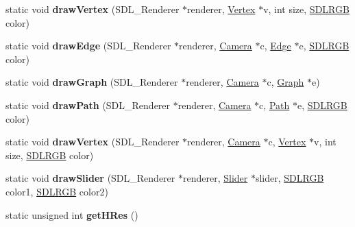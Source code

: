 \begin{DoxyCompactItemize}
\item 
\hypertarget{class_s_d_l_graph_draw_af9a230f883ac350775a38d0eee926556}{}static void {\bfseries draw\+Vertex} (S\+D\+L\+\_\+\+Renderer $\ast$renderer, \hyperlink{class_vertex}{Vertex} $\ast$v, int size, \hyperlink{class_s_d_l_r_g_b}{S\+D\+L\+R\+G\+B} color)\label{class_s_d_l_graph_draw_af9a230f883ac350775a38d0eee926556}

\item 
\hypertarget{class_s_d_l_graph_draw_aa9c19af048839c159e655a30c7a7c192}{}static void {\bfseries draw\+Edge} (S\+D\+L\+\_\+\+Renderer $\ast$renderer, \hyperlink{class_camera}{Camera} $\ast$c, \hyperlink{class_edge}{Edge} $\ast$e, \hyperlink{class_s_d_l_r_g_b}{S\+D\+L\+R\+G\+B} color)\label{class_s_d_l_graph_draw_aa9c19af048839c159e655a30c7a7c192}

\item 
\hypertarget{class_s_d_l_graph_draw_a4585253ab552da3e2c0d30a9cee26b25}{}static void {\bfseries draw\+Graph} (S\+D\+L\+\_\+\+Renderer $\ast$renderer, \hyperlink{class_camera}{Camera} $\ast$c, \hyperlink{class_graph}{Graph} $\ast$e)\label{class_s_d_l_graph_draw_a4585253ab552da3e2c0d30a9cee26b25}

\item 
\hypertarget{class_s_d_l_graph_draw_a1fedec02c2544aa6ac98f39912d068da}{}static void {\bfseries draw\+Path} (S\+D\+L\+\_\+\+Renderer $\ast$renderer, \hyperlink{class_camera}{Camera} $\ast$c, \hyperlink{class_path}{Path} $\ast$e, \hyperlink{class_s_d_l_r_g_b}{S\+D\+L\+R\+G\+B} color)\label{class_s_d_l_graph_draw_a1fedec02c2544aa6ac98f39912d068da}

\item 
\hypertarget{class_s_d_l_graph_draw_aa9606dc080a41bf5f135544f070a974a}{}static void {\bfseries draw\+Vertex} (S\+D\+L\+\_\+\+Renderer $\ast$renderer, \hyperlink{class_camera}{Camera} $\ast$c, \hyperlink{class_vertex}{Vertex} $\ast$v, int size, \hyperlink{class_s_d_l_r_g_b}{S\+D\+L\+R\+G\+B} color)\label{class_s_d_l_graph_draw_aa9606dc080a41bf5f135544f070a974a}

\item 
\hypertarget{class_s_d_l_graph_draw_a5204f8ce650f7acab334b4f38c8c13d0}{}static void {\bfseries draw\+Slider} (S\+D\+L\+\_\+\+Renderer $\ast$renderer, \hyperlink{class_slider}{Slider} $\ast$slider, \hyperlink{class_s_d_l_r_g_b}{S\+D\+L\+R\+G\+B} color1, \hyperlink{class_s_d_l_r_g_b}{S\+D\+L\+R\+G\+B} color2)\label{class_s_d_l_graph_draw_a5204f8ce650f7acab334b4f38c8c13d0}

\item 
\hypertarget{class_s_d_l_graph_draw_a4d8be1f34ec8eccb2e7e80d7228cf4b6}{}static unsigned int {\bfseries get\+H\+Res} ()\label{class_s_d_l_graph_draw_a4d8be1f34ec8eccb2e7e80d7228cf4b6}


\end{DoxyCompactItemize}
